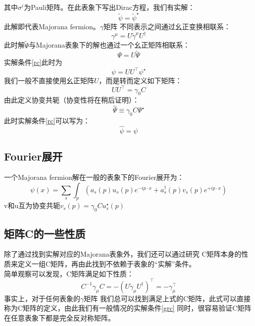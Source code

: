 \documentclass[10pt,openany]{book}
\theoremstyle{thmstyle} %
\theoremstyle{defstyle} %
\theoremstyle{prostyle} %
\begin{document}
其中$ \sigma^i $为Pauli矩阵。在此表象下写出Dirac方程，我们有实解：
\begin{equation}
  \widetilde{\psi}=\tilde{\psi}^{\star}\label{rc}
\end{equation} 
此解即代表Majorana fermion。$ \gamma $矩阵 不同表示之间通过幺正变换相联系：
\begin{equation}
  \gamma^\mu=U \tilde{\gamma}^\mu U^{\dagger}
\end{equation}
此时解$ \tilde{\Psi} $与Majorana表象下的解也通过一个幺正矩阵相联系：
\begin{equation}
  \Psi=U \tilde{\Psi}
\end{equation} 
实解条件\eqref{rc}此时为
\begin{equation}
  \psi=U U^{\top} \psi^{\star}
\end{equation}
我们一般不直接使用幺正矩阵$ U $，而是转而定义如下矩阵：
\begin{equation}
  U U^{\top}=\gamma_0 C
\end{equation} 
由此定义协变共轭（协变性将在稍后证明）：
\begin{equation}
  \hat{\Psi} \equiv \gamma_0 C \Psi^{\star}\label{ccg}
\end{equation}
此时实解条件\eqref{rc}可以写为：
\begin{equation}
  \hat{\psi}=\psi\label{grc}
\end{equation}
\subsection{Fourier展开}
一个Majorana fermion解在一般的表象下的Fourier展开为：
\begin{equation}
  \psi(x)=\sum_s \int_p\left(a_s(p) u_s(p) e^{-i p \cdot x}+a_s^{\dagger}(p) v_s(p) e^{+i p \cdot x}\right)
\end{equation}
v和u互为协变共轭$ v_s(p)=\gamma_0 C u_s^{\star}(p) $
\subsection{矩阵C的一些性质}
除了通过找到实解对应的Majorana表象外，我们还可以通过研究 C矩阵本身的性质来定义一组C矩阵，再由此找到不依赖于表象的“实解”条件。\\
简单观察可以发现，C矩阵满足如下性质：
\begin{equation}
  C^{-1} \gamma_\mu C=-\left(U \tilde{\gamma}_\mu U^{\dagger}\right)^{\top}=-\gamma_\mu^{\top}
\end{equation} 
事实上，对于任何表象的$ \gamma $矩阵 我们总可以找到满足上式的C矩阵，此式可以直接称为C矩阵的定义，由此我们有一般情况的实解条件\eqref{grc}
  同时，很容易验证C矩阵在任意表象下都是完全反对称矩阵。
\end{document}
